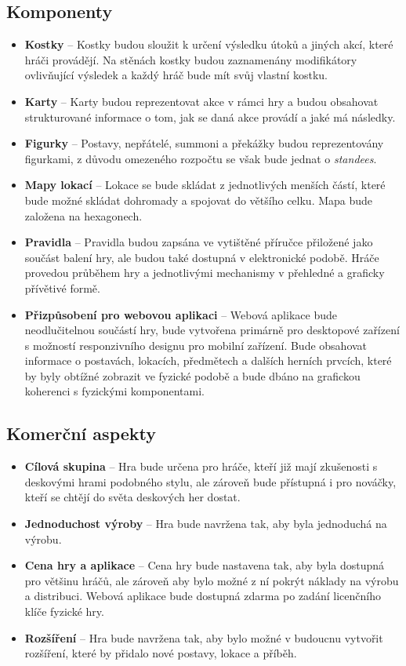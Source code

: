 \subsection*{Komponenty}
\label{subsec:req_components}

\begin{itemize}
    \item \textbf{Kostky} -- 
        Kostky budou sloužit k určení výsledku útoků a jiných akcí, které hráči provádějí. Na stěnách kostky budou zaznamenány modifikátory ovlivňující výsledek a každý hráč bude mít svůj vlastní kostku.
    \item \textbf{Karty} --
        Karty budou reprezentovat akce v rámci hry a budou obsahovat strukturované informace o tom, jak se daná akce provádí a jaké má následky.
    \item \textbf{Figurky} --
        Postavy, nepřátelé, summoni a překážky budou reprezentovány figurkami, z důvodu omezeného rozpočtu se však bude jednat o \textit{standees}.
    \item \textbf{Mapy lokací} --
        Lokace se bude skládat z jednotlivých menších částí, které bude možné skládat dohromady a spojovat do většího celku. Mapa bude založena na hexagonech.
    \item \textbf{Pravidla} --
        Pravidla budou zapsána ve vytištěné příručce přiložené jako součást balení hry, ale budou také dostupná v elektronické podobě. Hráče provedou průběhem hry a jednotlivými mechanismy v přehledné a graficky přívětivé formě.
    \item \textbf{Přizpůsobení pro webovou aplikaci} --
        Webová aplikace bude neodlučitelnou součástí hry, bude vytvořena primárně pro desktopové zařízení s možností responzivního designu pro mobilní zařízení. Bude obsahovat informace o postavách, lokacích, předmětech a dalších herních prvcích, které by byly obtížné zobrazit ve fyzické podobě a bude dbáno na grafickou koherenci s fyzickými komponentami.
\end{itemize}

\subsection*{Komerční aspekty}
\label{subsec:req_commercial}

\begin{itemize}
    \item \textbf{Cílová skupina} --
        Hra bude určena pro hráče, kteří již mají zkušenosti s deskovými hrami podobného stylu, ale zároveň bude přístupná i pro nováčky, kteří se chtějí do světa deskových her dostat.
    \item \textbf{Jednoduchost výroby} --
        Hra bude navržena tak, aby byla jednoduchá na výrobu.
    \item \textbf{Cena hry a aplikace} --
        Cena hry bude nastavena tak, aby byla dostupná pro většinu hráčů, ale zároveň aby bylo možné z ní pokrýt náklady na výrobu a distribuci. Webová aplikace bude dostupná zdarma po zadání licenčního klíče fyzické hry.
    \item \textbf{Rozšíření} --
        Hra bude navržena tak, aby bylo možné v budoucnu vytvořit rozšíření, které by přidalo nové postavy, lokace a příběh.
\end{itemize}